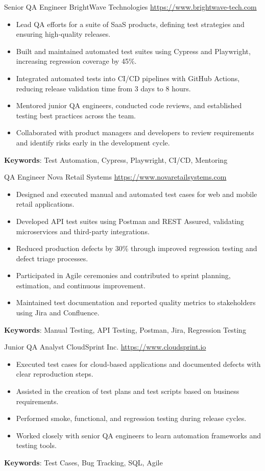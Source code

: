 \documentclass[a4paper, serif, 10pt]{moderncv}
\begin{document}
        {Senior QA Engineer}
        {BrightWave Technologies}
        {\url{https://www.brightwave-tech.com}}
        {}
        {\begin{itemize}
\item Lead QA efforts for a suite of SaaS products, defining test strategies and ensuring high-quality releases.
\item Built and maintained automated test suites using Cypress and Playwright, increasing regression coverage by 45\%.
\item Integrated automated tests into CI/CD pipelines with GitHub Actions, reducing release validation time from 3 days to 8 hours.
\item Mentored junior QA engineers, conducted code reviews, and established testing best practices across the team.
\item Collaborated with product managers and developers to review requirements and identify risks early in the development cycle.
\end{itemize}
\textbf{Keywords}: Test Automation, Cypress, Playwright, CI/CD, Mentoring}

        {QA Engineer}
        {Nova Retail Systems}
        {\url{https://www.novaretailsystems.com}}
        {}
        {\begin{itemize}
\item Designed and executed manual and automated test cases for web and mobile retail applications.
\item Developed API test suites using Postman and REST Assured, validating microservices and third-party integrations.
\item Reduced production defects by 30\% through improved regression testing and defect triage processes.
\item Participated in Agile ceremonies and contributed to sprint planning, estimation, and continuous improvement.
\item Maintained test documentation and reported quality metrics to stakeholders using Jira and Confluence.
\end{itemize}
\textbf{Keywords}: Manual Testing, API Testing, Postman, Jira, Regression Testing}

        {Junior QA Analyst}
        {CloudSprint Inc.}
        {\url{https://www.cloudsprint.io}}
        {}
        {\begin{itemize}
\item Executed test cases for cloud-based applications and documented defects with clear reproduction steps.
\item Assisted in the creation of test plans and test scripts based on business requirements.
\item Performed smoke, functional, and regression testing during release cycles.
\item Worked closely with senior QA engineers to learn automation frameworks and testing tools.
\end{itemize}
\textbf{Keywords}: Test Cases, Bug Tracking, SQL, Agile}
\end{document}
